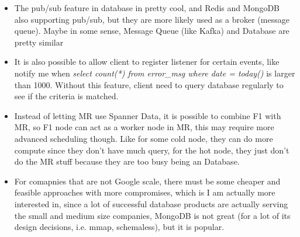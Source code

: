 \documentclass[12pt,a4paper,oneside]{article}
\begin{document}
\begin{itemize}
  \item The pub/sub feature in database in pretty cool, and Redis and MongoDB also supporting pub/sub, but they are more 
  likely used as a broker (message queue). Maybe in some sense, Message Queue (like Kafka) and Database are pretty similar
  \item It is also possible to allow client to register listener for certain events, like notify me when \textit{select count(*) from error\_msg where date = today()} is larger than 1000. Without this feature, client need to query database 
  regularly to see if the criteria is matched. 
  \item Instead of letting MR use Spanner Data, it is possible to combine F1 with MR, so F1 node can act as a worker node in MR, this may require more advanced scheduling though. Like for some cold node, they can do more compute since they don't have much query, for the hot node, they just don't do the MR stuff because they are too busy being an Database.
  \item For comapnies that are not Google scale, there must be some cheaper and feasible approaches with more compromises, which is I am actually more interested in, since a lot of successful database products are actually serving the small and medium size companies, MongoDB is not great (for a lot of its design decisions, i.e. mmap, schemaless), but it is popular.
\end{itemize}
\end{document}
